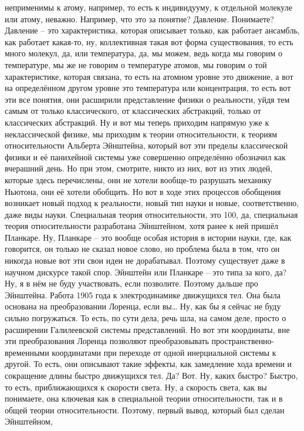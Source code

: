 неприменимы к атому, например, то есть к индивидууму, к отдельной молекуле или
атому, неважно. Например, что это за понятие? Давление. Понимаете? Давление –
это характеристика, которая описывает только, как работает ансамбль, как
работает какая-то, ну, коллективная такая вот форма существования, то есть много
молекул, да, или температура, да, мы можем, ведь когда мы говорим о температуре,
мы же не говорим о температуре атомов, мы говорим о той характеристике, которая
связана, то есть на атомном уровне это движение, а вот на определённом другом
уровне это температура или концентрация, то есть вот эти все понятия, они
расширили представление физики о реальности, уйдя тем самым от только
классического, от классических абстракций, только от классических абстракций. Ну
и вот мы теперь приходим напрямую уже к неклассической физике, мы приходим к
теории относительности, к теориям относительности Альберта Эйнштейна, который
вот эти пределы классической физики и её панихейной системы уже совершенно
определённо обозначил как вчерашний день. Но при этом, смотрите, никто из них,
вот из этих людей, которые здесь перечислены, они не хотели вообще-то разрушать
механику Ньютона, они её хотели обобщить. Но вот в ходе этих процессов обобщения
возникает новый подход к реальности, новый тип науки и новые, соответственно,
даже виды науки. Специальная теория относительности, это 100, да, специальная
теория относительности разработана Эйнштейном, хотя ранее к ней пришёл Планкаре.
Ну, Планкаре – это вообще особая история в истории науки, где, как говорится, он
только не сказал новое слово, но проблема была в том, что он никогда новые вот
эти свои идеи не дорабатывал. Поэтому существует даже в научном дискурсе такой
спор. Эйнштейн или Планкаре – это типа за кого, да? Ну, я в нём не буду
участвовать, если позволите. Поэтому дальше про Эйнштейна. Работа 1905 года к
электродинамике движущихся тел. Она была основана на преобразовании Лоренца,
если вы… Ну, как бы я сейчас не буду сильно погружаться. То есть, по сути дела,
речь шла, на самом деле, просто о расширении Галилеевской системы представлений.
Но вот эти координаты, вне эти преобразования Лоренца позволяют преобразовывать
пространственно-временными координатами при переходе от одной инерциальной
системы к другой. То есть, они описывают такие эффекты, как замедление хода
времени и сокращение длины быстро движущихся тел. Да? Вот. Ну, каких быстро?
Быстро, то есть, приближающихся к скорости света. Ну, а скорость света, как вы
понимаете, она ключевая как в специальной теории относительности, так и в общей
теории относительности. Поэтому, первый вывод, который был сделан Эйнштейном,
